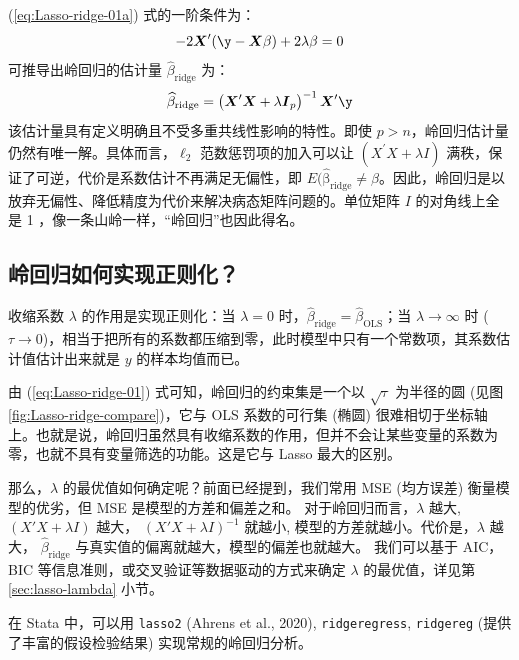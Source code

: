 (\ref{eq:Lasso-ridge-01a}) 式的一阶条件为：
$$
-2 \boldsymbol{X}^{\prime}(\boldsymbol{\y}-\boldsymbol{X} \beta)+2 \lambda \beta=0
$$
可推导出岭回归的估计量 $\widehat{\beta}_{\text {ridge}}$ 为：
\begin{equation}\label{eq:Lasso-21}
	\widehat{\beta}_{\text {ridge}} =\left(\boldsymbol{X}^{\prime} \boldsymbol{X}+\lambda \boldsymbol{I}_{p}\right)^{-1} \boldsymbol{X}^{\prime} \boldsymbol{\y}
\end{equation}
该估计量具有定义明确且不受多重共线性影响的特性。即使 $p>n$，岭回归估计量仍然有唯一解。具体而言，$\ell_{2}$ 范数惩罚项的加入可以让 $\left(X^{\prime} X+\lambda I\right)$ 满秩，保证了可逆，代价是系数估计不再满足无偏性，即 $E(\mathrm{\widehat{\beta}_{\text {ridge}}} \neq \beta$。因此，岭回归是以放弃无偏性、降低精度为代价来解决病态矩阵问题的。单位矩阵 $I$ 的对角线上全是 1 ，像一条山岭一样，“岭回归”也因此得名。

\subsection{岭回归如何实现正则化？}

收缩系数 $\lambda$ 的作用是实现正则化：当 $\lambda=0$ 时，$\widehat{\beta}_{\text {ridge}}=\widehat{\beta}_{\text {OLS}}$；当 $\lambda \to \infty$ 时 ($\tau \to 0$)，相当于把所有的系数都压缩到零，此时模型中只有一个常数项，其系数估计值估计出来就是 $y$ 的样本均值而已。

由 (\ref{eq:Lasso-ridge-01}) 式可知，岭回归的约束集是一个以 $\sqrt{\tau}$ 为半径的圆 (见图 \ref{fig:Lasso-ridge-compare})，它与 OLS 系数的可行集 (椭圆) 很难相切于坐标轴上。也就是说，岭回归虽然具有收缩系数的作用，但并不会让某些变量的系数为零，也就不具有变量筛选的功能。这是它与 Lasso 最大的区别。   

那么，$\lambda$ 的最优值如何确定呢？前面已经提到，我们常用 MSE (均方误差) 衡量模型的优劣，但 MSE 是模型的方差和偏差之和。
对于岭回归而言，$\lambda$ 越大, $(X'X+\lambda I)$ 越大， $\left(X'X+\lambda I\right)^{-1}$ 就越小, 模型的方差就越小。代价是，$\lambda$ 越大， $\widehat{\beta}_{\text {ridge}}$ 与真实值的偏离就越大，模型的偏差也就越大。
我们可以基于 AIC，BIC 等信息准则，或交叉验证等数据驱动的方式来确定 $\lambda$ 的最优值，详见第 \ref{sec:lasso-lambda} 小节。

在 Stata 中，可以用 \texttt{lasso2} (Ahrens et al., 2020), \texttt{ridgeregress}, \texttt{ridgereg} (提供了丰富的假设检验结果) 实现常规的岭回归分析。

